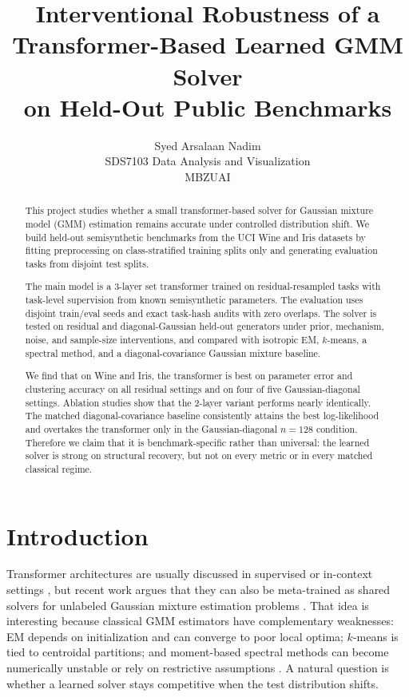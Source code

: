 \documentclass{article}
\title{Interventional Robustness of a Transformer-Based Learned GMM Solver\\on Held-Out Public Benchmarks}
\author{
  Syed Arsalaan Nadim \\
  SDS7103 Data Analysis and Visualization \\
  MBZUAI
}
\begin{document}
\maketitle

\begin{abstract}
This project studies whether a small transformer-based solver for Gaussian mixture model (GMM) estimation remains accurate under controlled distribution shift. We build held-out semisynthetic benchmarks from the UCI Wine and Iris datasets by fitting preprocessing on class-stratified training splits only and generating evaluation tasks from disjoint test splits.

The main model is a 3-layer set transformer trained on residual-resampled tasks with task-level supervision from known semisynthetic parameters. The evaluation uses disjoint train/eval seeds and exact task-hash audits with zero overlaps. The solver is tested on residual and diagonal-Gaussian held-out generators under prior, mechanism, noise, and sample-size interventions, and compared with isotropic EM, $k$-means, a spectral method, and a diagonal-covariance Gaussian mixture baseline. 

We find that on Wine and Iris, the transformer is best on parameter error and clustering accuracy on all residual settings and on four of five Gaussian-diagonal settings. Ablation studies show that the 2-layer variant performs nearly identically. The matched diagonal-covariance baseline consistently attains the best log-likelihood and overtakes the transformer only in the Gaussian-diagonal $n=128$ condition. Therefore we claim that it is benchmark-specific rather than universal: the learned solver is strong on structural recovery, but not on every metric or in every matched classical regime.
\end{abstract}

\section{Introduction}
Transformer architectures are usually discussed in supervised or in-context settings \citep{vaswani2017attention}, but recent work argues that they can also be meta-trained as shared solvers for unlabeled Gaussian mixture estimation problems \citep{chen2026tgmm}. That idea is interesting because classical GMM estimators have complementary weaknesses: EM depends on initialization and can converge to poor local optima; $k$-means is tied to centroidal partitions; and moment-based spectral methods can become numerically unstable or rely on restrictive assumptions \citep{dempster1977em,macqueen1967kmeans,anandkumar2014tensor,mclachlan2000finite}. A natural question is whether a learned solver stays competitive when the test distribution shifts.
\end{document}
